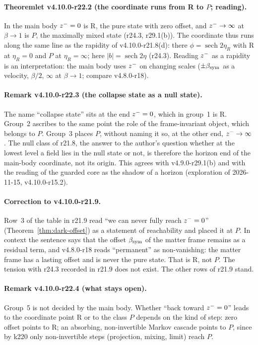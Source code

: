 \paragraph{Theoremlet v4.10.0-r22.2 (the coordinate runs from R to \(P\); reading).}
In the main body \(z^-=0\) is R, the pure state with zero offset, and \(z^-\to\infty\) at \(\beta\to1\) is \(P\), the maximally mixed
state (r24.3, r29.1(b)).  The coordinate thus runs along the same line as the rapidity of v4.10.0-r21.8(d): there
\(\phi=\operatorname{sech}2\eta_R\) with R at \(\eta_R=0\) and \(P\) at \(\eta_R=\infty\); here \(|b|=\operatorname{sech}2\eta\) (r24.3).  Reading \(z^-\) as a
rapidity is an interpretation: the main body uses \(z^-\) on changing scales (\(\pm\beta_{\mathrm{sym}}\) as a velocity, \(\beta/2\), \(\infty\) at \(\beta\to1\);
compare v4.8.0-r18).

\paragraph{Remark v4.10.0-r22.3 (the collapse state as a null state).}
The name ``collapse state'' sits at the end \(z^-=0\), which in group~1 is R.  Group~2 ascribes to the same point the role of the
frame-invariant object, which belongs to \(P\).  Group~3 places \(P\), without naming it so, at the other end, \(z^-\to\infty\).  The null
class of r21.8, the answer to the author's question whether at the lowest level a field lies in the null state or not, is therefore
the horizon end of the main-body coordinate, not its origin.  This agrees with v4.9.0-r29.1(b) and with the reading of the guarded core
as the shadow of a horizon (exploration of 2026-11-15, v4.10.0-r15.2).

\paragraph{Correction to v4.10.0-r21.9.}
Row~3 of the table in r21.9 read ``we can never fully reach \(z^-=0\)'' (Theorem~\ref{thm:dark-offset}) as a statement of reachability
and placed it at \(P\).  In context the sentence says that the offset \(\beta_{\mathrm{sym}}\) of the matter frame remains as a residual term, and
v4.8.0-r18 reads ``permanent'' as non-vanishing: the matter frame has a lasting offset and is never the pure state.  That is R, not
\(P\).  The tension with r24.3 recorded in r21.9 does not exist.  The other rows of r21.9 stand.

\paragraph{Remark v4.10.0-r22.4 (what stays open).}
Group~5 is not decided by the main body.  Whether ``back toward \(z^-=0\)'' leads to the coordinate point R or to the class \(P\) depends
on the kind of step: zero offset points to R; an absorbing, non-invertible Markov cascade points to \(P\), since by k220 only
non-invertible steps (projection, mixing, limit) reach \(P\).

